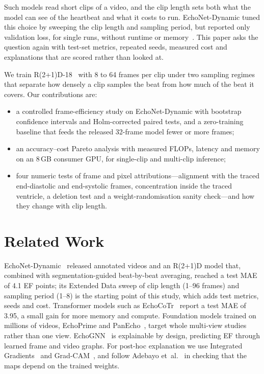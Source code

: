\documentclass[conference]{IEEEtran}
\begin{document}
Such models read short clips of a video, and the clip length sets both what the model can see
of the heartbeat and what it costs to run. EchoNet-Dynamic tuned this choice by sweeping the clip
length and sampling period, but reported only validation loss, for single runs, without
runtime or memory~\cite{ouyang2020nature}. This paper asks the question again with test-set
metrics, repeated seeds, measured cost and explanations that are scored rather than looked at.

We train R(2+1)D-18~\cite{tran2018closer} with 8 to 64 frames per clip under two sampling
regimes that separate how densely a clip samples the beat from how much of the beat it covers.
Our contributions are:
\begin{itemize}
\item a controlled frame-efficiency study on EchoNet-Dynamic with bootstrap confidence intervals
and Holm-corrected paired tests, and a zero-training baseline that feeds the released 32-frame
model fewer or more frames;
\item an accuracy--cost Pareto analysis with measured FLOPs, latency and memory on an 8\,GB
consumer GPU, for single-clip and multi-clip inference;
\item four numeric tests of frame and pixel attributions---alignment with the traced
end-diastolic and end-systolic frames, concentration inside the traced ventricle, a deletion
test and a weight-randomisation sanity check---and how they change with clip length.
\end{itemize}

\section{Related Work}
EchoNet-Dynamic~\cite{ouyang2020nature,ouyang2019ml4h} released \edaNAll{} annotated videos and an
R(2+1)D model that, combined with segmentation-guided beat-by-beat averaging, reached a test MAE
of 4.1 EF points; its Extended Data sweep of clip length (1--96 frames) and sampling period
(1--8) is the starting point of this study, which adds test metrics, seeds and cost.
Transformer models such as EchoCoTr~\cite{echocotr2022} report a test MAE of 3.95, a small gain
for more memory and compute. Foundation models trained on millions of videos, EchoPrime and
PanEcho~\cite{echoprime,panecho}, target whole multi-view studies rather than one view.
EchoGNN~\cite{mokhtari2022echognn} is explainable by design, predicting EF through learned
frame and video graphs. For post-hoc explanation we use Integrated
Gradients~\cite{sundararajan2017axiomatic} and Grad-CAM~\cite{selvaraju2017gradcam}, and follow
Adebayo et~al.~\cite{adebayo2018sanity} in checking that the maps depend on the trained weights.
\end{document}
